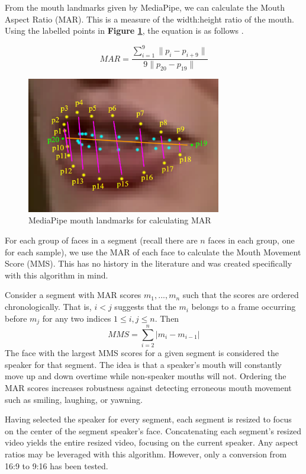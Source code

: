 \documentclass{article}
\begin{document}
From the mouth landmarks given by MediaPipe, we can calculate the Mouth Aspect Ratio (MAR). This is a measure of the width:height ratio of the mouth. Using the labelled points in \textbf{Figure \ref{fig:MAR}}, the equation is as follows \cite{MAR}.

\[ MAR = \frac{\sum_{i=1}^9 \|p_{i} - p_{i+9}\|}{9\|p_{20} - p_{19}\|} \]

\begin{figure}[htb]
\begin{minipage}[b]{1.0\linewidth}
    \centering
    \centerline{\includegraphics[width=8.5cm]{MAR.png}}
    \medskip
\end{minipage}
\caption{MediaPipe mouth landmarks for calculating MAR}
\label{fig:MAR}
\end{figure}

For each group of faces in a segment (recall there are $n$ faces in each group, one for each sample), we use the MAR of each face to calculate the Mouth Movement Score (MMS). This has no history in the literature and was created specifically with this algorithm in mind. 

Consider a segment with MAR scores $m_1, ..., m_n$ such that the scores are ordered chronologically. That is, $i < j$ suggests that the $m_i$ belongs to a frame occurring before $m_j$ for any two indices $1 \le i, j \le n$. Then 
\[ MMS = \sum_{i=2}^n{|m_i - m_{i-1}}| \]
The face with the largest MMS scores for a given segment is considered the speaker for that segment. The idea is that a speaker's mouth will constantly move up and down overtime while non-speaker mouths will not. Ordering the MAR scores increases robustness against detecting erroneous mouth movement such as smiling, laughing, or yawning.

Having selected the speaker for every segment, each segment is resized to focus on the center of the segment speaker's face. Concatenating each segment's resized video yields the entire resized video, focusing on the current speaker. Any aspect ratios may be leveraged with this algorithm. However, only a conversion from 16:9 to 9:16 has been tested.
\end{document}
